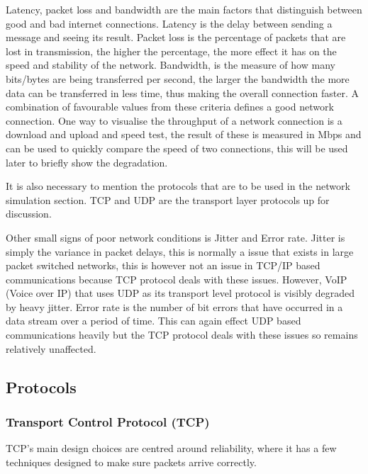 Latency, packet loss and bandwidth are the main factors that distinguish between good and bad internet connections. Latency is the delay between sending a message and seeing its result. Packet loss is the percentage of packets that are lost in transmission, the higher the percentage, the more effect it has on the speed and stability of the network. Bandwidth, is the measure of how many bits/bytes are being transferred per second, the larger the bandwidth the more data can be transferred in less time, thus making the overall connection faster. A combination of favourable values from these criteria defines a good network connection. One way to visualise the throughput of a network connection is a download and upload and speed test, the result of these is measured in Mbps and can be used to quickly compare the speed of two connections, this will be used later to briefly show the degradation.

It is also necessary to mention the protocols that are to be used in the network simulation section. TCP \citep{TCP} and UDP \citep{UDP} are the transport layer protocols up for discussion. 

Other small signs of poor network conditions is Jitter and Error rate. Jitter is simply the variance in packet delays, this is normally a issue that exists in large packet switched networks, this is however not an issue in TCP/IP based communications because TCP protocol deals with these issues. However, VoIP (Voice over IP) that uses UDP as its transport level protocol is visibly degraded by heavy jitter. Error rate is the number of bit errors that have occurred in a data stream over a period of time. This can again effect UDP based communications heavily but the TCP protocol deals with these issues so remains relatively unaffected.


\subsection{Protocols}
\subsubsection{Transport Control Protocol (TCP)}
TCP's main design choices are centred around reliability, where it has a few techniques designed to make sure packets arrive correctly. 

